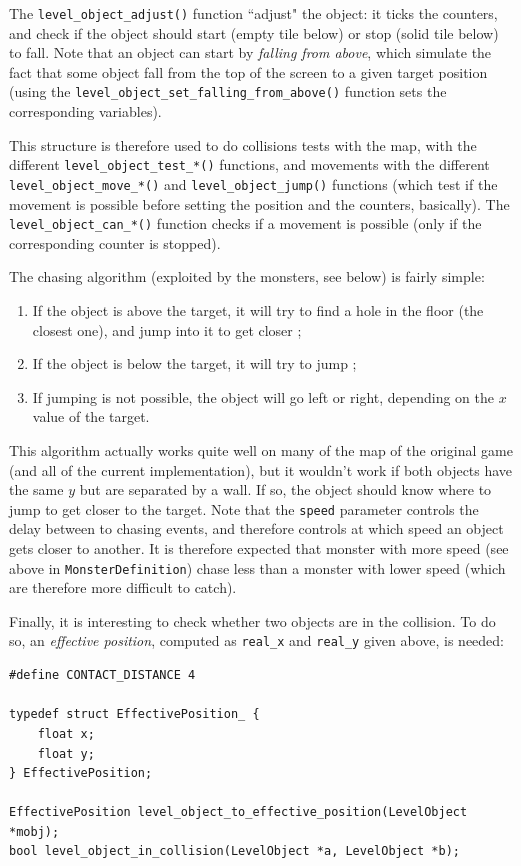 \documentclass[12pt,a4paper]{article}
\newcommand{\cc}[1]{\texttt{#1}}
\begin{document}
The \cc{level_object_adjust()} function ``adjust" the object: it ticks the counters, and check if the object should start (empty tile below) or stop (solid tile below) to fall. Note that an object can start by \textit{falling from above}, which simulate the fact that some object fall from the top of the screen to a given target position (using the \cc{level_object_set_falling_from_above()} function sets the corresponding variables).

This structure is therefore used to do collisions tests with the map, with the different \cc{level_object_test_*()} functions, and movements with the different \cc{level_object_move_*()} and \cc{level_object_jump()} functions (which test if the movement is possible before setting the position and the counters, basically). The \cc{level_object_can_*()} function checks if a movement is possible (only if the corresponding counter is stopped).

The chasing algorithm (exploited by the monsters, see below) is fairly simple:\begin{enumerate}
\item If the object is above the target, it will try to find a hole in the floor (the closest one), and jump into it to get closer ;
\item If the object is below the target, it will try to jump ;
\item If jumping is not possible, the object will go left or right, depending on the $x$ value of the target.
\end{enumerate}
This algorithm actually works quite well on many of the map of the original game (and all of the current implementation), but it wouldn't work if both objects have the same $y$ but are separated by a wall. If so, the object should know where to jump to get closer to the target. Note that the \cc{speed} parameter controls the delay between to chasing events, and therefore controls at which speed an object gets closer to another. It is therefore expected that monster with more speed (see above in \cc{MonsterDefinition}) chase less than a monster with lower speed (which are therefore more difficult to catch).

Finally, it is interesting to check whether two objects are in the collision. To do so, an \textit{effective position}, computed as \cc{real_x} and \cc{real_y} given above, is needed:
\begin{verbatim}
#define CONTACT_DISTANCE 4

typedef struct EffectivePosition_ {
	float x;
	float y;
} EffectivePosition;

EffectivePosition level_object_to_effective_position(LevelObject *mobj);
bool level_object_in_collision(LevelObject *a, LevelObject *b);
\end{verbatim}
\end{document}
